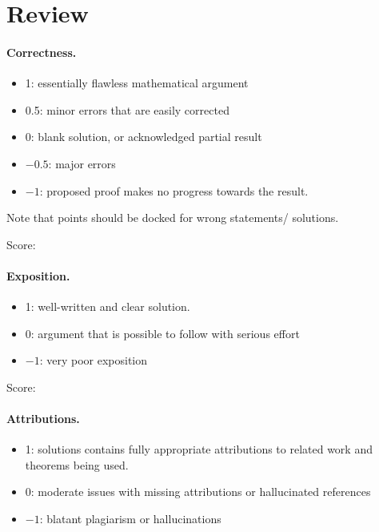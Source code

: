 \documentclass[11pt]{article}
\theoremstyle{remark}
\begin{document}
\maketitle

\section{Review}

\paragraph{Correctness.}
\begin{itemize}
	\item  1: essentially flawless mathematical argument
	\item  0.5: minor errors that are easily corrected
	\item  0: blank solution, or acknowledged partial result
	\item  $-0.5$: major errors
	\item  $-1$: proposed proof makes no progress towards the result.
\end{itemize}
Note that points should be docked for wrong statements/ solutions.

\noindent Score:

\paragraph{Exposition.}
\begin{itemize}
	\item  1: well-written and clear solution.
	\item  0: argument that is possible to follow with serious effort
	\item  $-1$: very poor exposition
\end{itemize}

\noindent Score:

\paragraph{Attributions.}
\begin{itemize}
	\item  1: solutions contains fully appropriate attributions
		to related work and theorems being used.
	\item  0: moderate issues with missing attributions or hallucinated references
	\item  $-1$: blatant plagiarism or hallucinations
\end{itemize}
\end{document}
